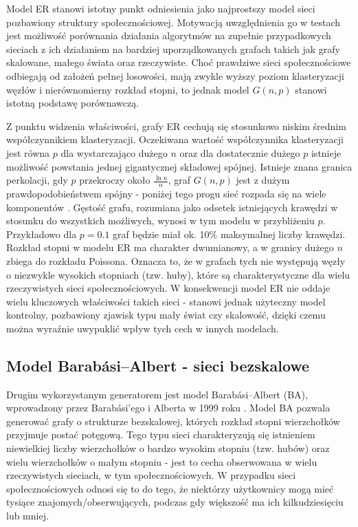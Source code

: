 Model ER stanowi istotny punkt odniesienia jako najprostszy model sieci pozbawiony struktury społecznościowej. Motywacją uwzględnienia go w testach jest możliwość porównania działania algorytmów na zupełnie przypadkowych sieciach z ich działaniem na bardziej uporządkowanych grafach takich jak grafy skalowane, małego świata oraz rzeczywiste. Choć prawdziwe sieci społecznościowe odbiegają od założeń pełnej losowości, mają zwykle wyższy poziom klasteryzacji węzłów i nierównomierny rozkład stopni, to jednak model $G(n, p)$ stanowi istotną podstawę porównawczą.

Z punktu widzenia właściwości, grafy ER cechują się stosunkowo niskim średnim współczynnikiem klasteryzacji. Oczekiwana wartość współczynnika klasteryzacji jest równa $p$ dla wystarczająco dużego $n$ oraz dla dostatecznie dużego $p$ istnieje możliwość powstania jednej gigantycznej składowej spójnej. Istnieje znana granica perkolacji, gdy $p$ przekroczy około $\frac{\ln n}{n}$, graf $G(n, p)$ jest z dużym prawdopodobieństwem spójny - poniżej tego progu sieć rozpada się na wiele komponentów \cite{ErdosRenyi1960}. Gęstość grafu, rozumiana jako odsetek istniejących krawędzi w stosunku do wszystkich możliwych, wynosi w tym modelu w przybliżeniu $p$. Przykładowo dla $p=0.1$ graf będzie miał ok. 10\% maksymalnej liczby krawędzi. Rozkład stopni w modelu ER ma charakter dwumianowy, a w granicy dużego $n$ zbiega do rozkładu Poissona. Oznacza to, że w grafach tych nie występują węzły o niezwykle wysokich stopniach (tzw. huby), które są charakterystyczne dla wielu rzeczywistych sieci społecznościowych. W konsekwencji model ER nie oddaje wielu kluczowych właściwości takich sieci - stanowi jednak użyteczny model kontrolny, pozbawiony zjawisk typu mały świat czy skalowość, dzięki czemu można wyraźnie uwypuklić wpływ tych cech w innych modelach.


\subsection{Model Barabási--Albert - sieci bezskalowe}
Drugim wykorzystanym generatorem jest model Barabási--Albert (BA), wprowadzony przez Barabási’ego i Alberta w 1999 roku \cite{barabasi1999emergence}. Model BA pozwala generować grafy o strukturze bezskalowej, których rozkład stopni wierzchołków przyjmuje postać potęgową. Tego typu sieci charakteryzują się istnieniem niewielkiej liczby wierzchołków o bardzo wysokim stopniu (tzw. hubów) oraz wielu wierzchołków o małym stopniu - jest to cecha obserwowana w wielu rzeczywistych sieciach, w tym społecznościowych. W przypadku sieci społecznościowych odnosi się to do tego, że niektórzy użytkownicy mogą mieć tysiące znajomych/obserwujących, podczas gdy większość ma ich kilkudziesięciu lub mniej.

